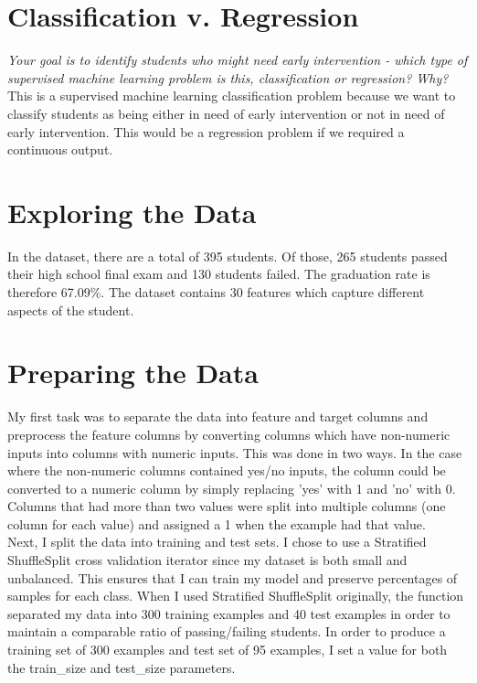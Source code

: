 \documentclass[11pt]{article}
\begin{document}
\section{Classification v. Regression}

\textit{Your goal is to identify students who might need early intervention - which type of supervised machine learning problem is this, classification or regression? Why?}\\

This is a supervised machine learning classification problem because we want to classify students as being either in need of early intervention or not in need of early intervention. This would be a regression problem if we required a continuous output.

\section{Exploring the Data}

In the dataset, there are a total of 395 students. Of those, 265 students passed their high school final exam and 130 students failed. The graduation rate is therefore 67.09\%. The dataset contains 30 features which capture different aspects of the student.\\

\section{Preparing the Data}

My first task was to separate the data into feature and target columns and preprocess the feature columns by converting columns which have non-numeric inputs into columns with numeric inputs. This was done in two ways. In the case where the non-numeric columns contained yes/no inputs, the column could be converted to a numeric column by simply replacing 'yes' with 1 and 'no' with 0.\\

Columns that had more than two values were split into multiple columns (one column for each value) and assigned a 1 when the example had that value.\\

Next, I split the data into training and test sets. I chose to use a Stratified ShuffleSplit cross validation iterator since my dataset is both small and unbalanced. This ensures that I can train my model and preserve percentages of samples for each class. When I used Stratified ShuffleSplit originally, the function separated my data into 300 training examples and 40 test examples in order to maintain a comparable ratio of passing/failing students.  In order to produce a training set of 300 examples and test set of 95 examples, I set a value for both the train\_size and test\_size parameters.
\end{document}
